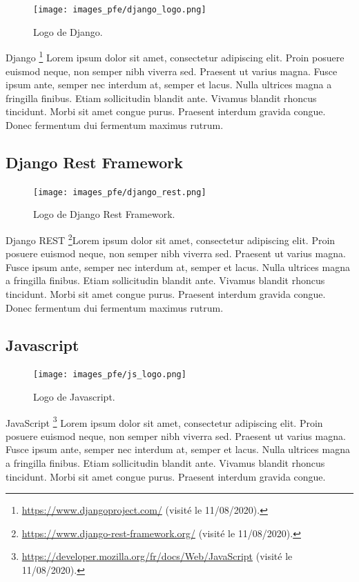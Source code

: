\begin{figure}
  \centering
  \texttt{[image: images\_pfe/django\_logo.png]}
  \caption{Logo de Django.}
\end{figure}
\FloatBarrier
Django \footnote{\url{https://www.djangoproject.com/} (visité le 11/08/2020).} Lorem ipsum dolor sit amet, consectetur adipiscing elit. Proin posuere euismod neque, non semper nibh viverra sed. Praesent ut varius magna. Fusce ipsum ante, semper nec interdum at, semper et lacus. Nulla ultrices magna a fringilla finibus. Etiam sollicitudin blandit ante. Vivamus blandit rhoncus tincidunt. Morbi sit amet congue purus. Praesent interdum gravida congue. Donec fermentum dui fermentum maximus rutrum.

\vspace{.5cm}

\subsection*{Django Rest Framework}

\begin{figure}
  \centering
  \texttt{[image: images\_pfe/django\_rest.png]}
  \caption{Logo de Django Rest Framework.}
\end{figure}
\FloatBarrier
Django REST \footnote{\url{https://www.django-rest-framework.org/} (visité le 11/08/2020).}Lorem ipsum dolor sit amet, consectetur adipiscing elit. Proin posuere euismod neque, non semper nibh viverra sed. Praesent ut varius magna. Fusce ipsum ante, semper nec interdum at, semper et lacus. Nulla ultrices magna a fringilla finibus. Etiam sollicitudin blandit ante. Vivamus blandit rhoncus tincidunt. Morbi sit amet congue purus. Praesent interdum gravida congue. Donec fermentum dui fermentum maximus rutrum.

\vspace{.5cm}

\subsection*{Javascript}
\begin{figure}
  \centering
  \texttt{[image: images\_pfe/js\_logo.png]}
  \caption{Logo de Javascript.}
\end{figure}
\FloatBarrier
JavaScript \footnote{\url{https://developer.mozilla.org/fr/docs/Web/JavaScript} (visité le 11/08/2020).} Lorem ipsum dolor sit amet, consectetur adipiscing elit. Proin posuere euismod neque, non semper nibh viverra sed. Praesent ut varius magna. Fusce ipsum ante, semper nec interdum at, semper et lacus. Nulla ultrices magna a fringilla finibus. Etiam sollicitudin blandit ante. Vivamus blandit rhoncus tincidunt. Morbi sit amet congue purus. Praesent interdum gravida congue. 

